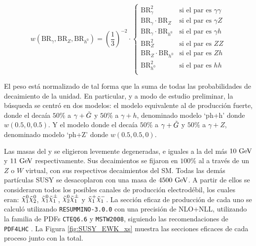 

\begin{equation}
  w(\text{BR}_{\gamma}, \text{BR}_{Z}, \text{BR}_{h^{0}})=\left(\frac{1}{3}\right)^{-2}\cdot\begin{cases}
    \text{BR}_{\gamma}^{2} & \text{si el par es } \gamma\gamma \\
    \text{BR}_{\gamma}\cdot\text{BR}_{Z} & \text{si el par es } \gamma Z \\
    \text{BR}_{\gamma}\cdot\text{BR}_{h^{0}} & \text{si el par es } \gamma h \\
    \text{BR}_{Z}^{2} & \text{si el par es } ZZ \\
    \text{BR}_{Z}\cdot\text{BR}_{h^{0}} & \text{si el par es } Zh \\
    \text{BR}_{h^{0}}^{2} & \text{si el par es } hh \\
  \end{cases}
\end{equation}

El peso está normalizado de tal forma que la suma de todas las probabilidades de decaimiento de la unidad. En particular, y a modo de estudio preliminar, la búsqueda se centró en dos modelos: el modelo equivalente al de producción fuerte, donde el \ninoone decaía $50\%$ a $\gamma + \tilde{G}$ y $50\%$ a $\gamma + h$, denominado modelo `ph+h' donde $w(0.5, 0, 0.5)$. Y el modelo donde el \ninoone decaía $50\%$ a $\gamma + \tilde{G}$ y $50\%$ a $\gamma + Z$, denominado modelo `ph+Z' donde $w(0.5, 0.5, 0)$.

Las masas del \ninotwo y \chinopm se eligieron levemente degeneradas, e iguales a la del \ninoone más $10\ \text{GeV}$ y $11\ \text{GeV}$ respectivamente. Sus decaimientos se fijaron en $100\%$ al \ninoone a través de un $Z$ o $W$ virtual, con sus respectivos decaimientos del SM. Todas las demás partículas SUSY se desacoplaron con una masa de $4500\ \text{GeV}$. A partir de ellos se consideraron todos los posibles canales de producción electrodébil, los cuales eran: $\ninoone \ninotwo$, $\ninoone \chinoonepm$, $\ninotwo \chinoonepm$ y $\chinoonep \chinoonem$. La sección eficaz de producción de cada uno se calculó utilizando \texttt{RESUMMINO-3.0.0} \cite{Beenakker:1999xh,Debove:2010kf,Fuks:2012qx,Fuks:2013vua,Fiaschi:2018hgm} con una precisión de NLO+NLL, utilizando la familia de PDFs \texttt{CTEQ6.6} y \texttt{MSTW2008}, siguiendo las recomendaciones de \texttt{PDF4LHC} \cite{Butterworth:2015oua}. La Figura \ref{fig:SUSY_EWK_xs} muestra las secciones eficaces de cada proceso junto con la total.

